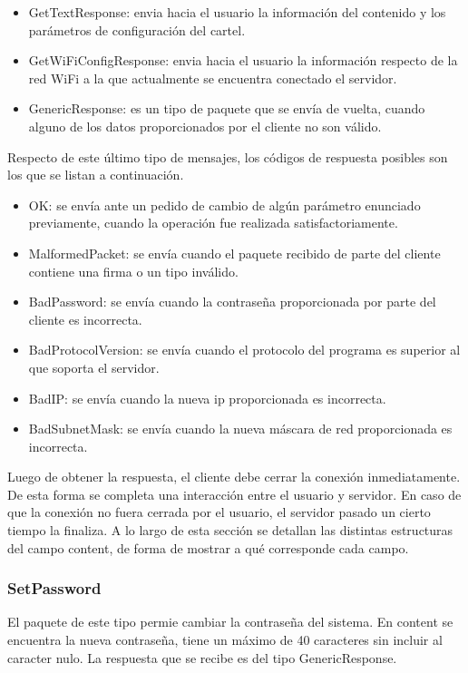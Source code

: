 \begin{itemize}
	\item GetTextResponse: envia hacia el usuario la información del contenido y los parámetros de configuración del cartel.
	\item GetWiFiConfigResponse: envia hacia el usuario la información respecto de la red WiFi a la que actualmente se encuentra conectado el servidor.
	\item GenericResponse: es un tipo de paquete que se envía de vuelta, cuando alguno de los datos proporcionados por el cliente no son válido.
\end{itemize}

Respecto de este último tipo de mensajes, los códigos de respuesta posibles son los que se listan a continuación.

\begin{itemize}
	\item OK: se envía ante un pedido de cambio de algún parámetro enunciado previamente, cuando la operación fue realizada satisfactoriamente.
	\item MalformedPacket: se envía cuando el paquete recibido de parte del cliente contiene una firma o un tipo inválido.
	\item BadPassword: se envía cuando la contraseña proporcionada por parte del cliente es incorrecta.
	\item BadProtocolVersion: se envía cuando el protocolo del programa es superior al que soporta el servidor.
	\item BadIP: se envía cuando la nueva ip proporcionada es incorrecta.
	\item BadSubnetMask: se envía cuando la nueva máscara de red proporcionada es incorrecta.
\end{itemize}

Luego de obtener la respuesta, el cliente debe cerrar la conexión inmediatamente.
De esta forma se completa una interacción entre el usuario y servidor.
En caso de que la conexión no fuera cerrada por el usuario, el servidor pasado un cierto tiempo la finaliza.
A lo largo de esta sección se detallan las distintas estructuras del campo content, de forma de mostrar a qué corresponde cada campo.



\subsubsection{SetPassword}

El paquete de este tipo permie cambiar la contraseña del sistema.
En content se encuentra la nueva contraseña, tiene un máximo de 40 caracteres sin incluir al caracter nulo.
La respuesta que se recibe es del tipo GenericResponse.



